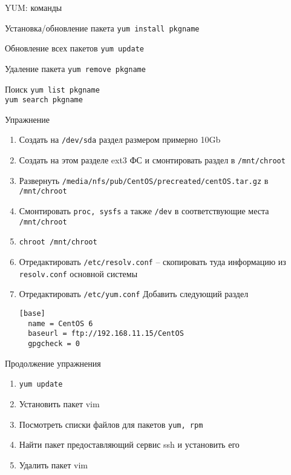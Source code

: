 \documentclass[ignorenonframetext, professionalfonts, hyperref={pdftex, unicode}]{beamer}
\newcounter{tmpc}
\begin{document}
\begin{frame}{YUM: команды}
	\begin{block}{Установка/обновление пакета}
		{\tt yum install pkgname }
	\end{block}
	\begin{block}{Обновление всех пакетов}
		{\tt yum update }
	\end{block}
	\begin{block}{Удаление пакета}
		{\tt yum remove pkgname }
	\end{block}
	\begin{block}{Поиск}
		{\tt yum list pkgname }\\
		{\tt yum search pkgname }
	\end{block}
\end{frame}


\begin{frame}[fragile]{Упражнение}
  \begin{enumerate}
      \item Создать на {\tt /dev/sda} раздел размером примерно 10Gb
      \item Создать на этом разделе ext3 ФС и смонтировать раздел в {\tt /mnt/chroot}
      \item Развернуть {\tt /media/nfs/pub/CentOS/precreated/centOS.tar.gz} в {\tt /mnt/chroot}
      \item Смонтировать {\tt proc, sysfs} а также {\tt /dev} в соответствующие места {\tt /mnt/chroot}
      \item {\tt chroot /mnt/chroot}
      \item Отредактировать {\tt /etc/resolv.conf} -- скопировать туда информацию из {\tt resolv.conf} основной системы
      \item Отредактировать {\tt /etc/yum.conf} Добавить следующий раздел
\begin{minipage}{0.5\textwidth}
\begin{verbatim}
[base]
  name = CentOS 6
  baseurl = ftp://192.168.11.15/CentOS
  gpgcheck = 0
\end{verbatim}
\end{minipage}
\setcounter{tmpc}{\theenumi}
\end{enumerate}
\end{frame}
\begin{frame}{Продолжение упражнения}
  \begin{enumerate}
      \setcounter{enumi}{\thetmpc}
      \item {\tt yum update}
      \item Установить пакет vim
      \item Посмотреть списки файлов для пакетов {\tt yum, rpm}
      \item Найти пакет предоставляющий сервис ssh и установить его
      \item Удалить пакет vim
    \end{enumerate}
\end{frame}
\end{document}
